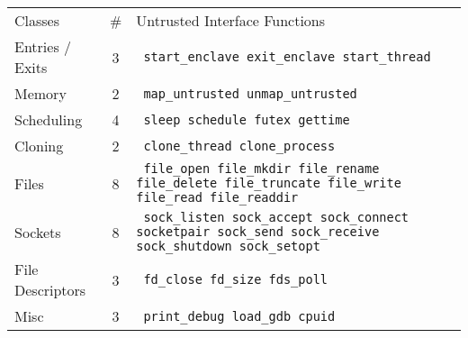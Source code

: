 \footnotesize
\begin{tabular}{lcp{4.5in}}
\hline
\addlinespace
Classes & \# & Untrusted Interface Functions \\
\addlinespace
\hline
Entries / Exits & 3 & {\tt
start\_enclave
exit\_enclave
start\_thread
} \\
\hline
Memory & 2 & {\tt
map\_untrusted
unmap\_untrusted
} \\
\hline
Scheduling & 4 & {\tt
sleep
schedule
futex
gettime
} \\
\hline
Cloning & 2 & {\tt
clone\_thread
clone\_process
} \\
\hline
Files & 8 & {\tt
file\_open
file\_mkdir
file\_rename
file\_delete
file\_truncate
file\_write
file\_read
file\_readdir
} \\
\hline
Sockets & 8 & {\tt
sock\_listen
sock\_accept
sock\_connect
socketpair
sock\_send
sock\_receive
sock\_shutdown
sock\_setopt
} \\
\hline
File Descriptors & 3 & {\tt
fd\_close
fd\_size
fds\_poll
} \\
\hline
Misc & 3 & {\tt
print\_debug
load\_gdb
cpuid
} \\
\hline
\end{tabular}
